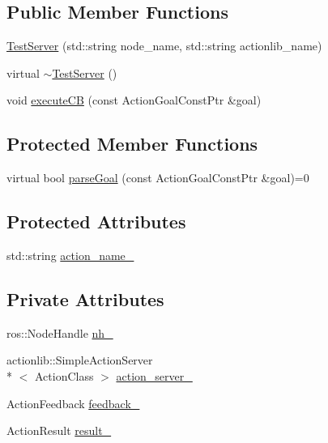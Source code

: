 \subsection*{Public Member Functions}
\begin{DoxyCompactItemize}
\item 
\hyperlink{classsarafun_1_1TestServer_a96cf3cc9457ec2c15490f2e2d216ce1f_a96cf3cc9457ec2c15490f2e2d216ce1f}{Test\-Server} (std\-::string node\-\_\-name, std\-::string actionlib\-\_\-name)
\item 
virtual \hyperlink{classsarafun_1_1TestServer_a1f29e46804b976730e607ca995684dca_a1f29e46804b976730e607ca995684dca}{$\sim$\-Test\-Server} ()
\item 
void \hyperlink{classsarafun_1_1TestServer_af09ba35e2df86537a878f7a9de8c795e_af09ba35e2df86537a878f7a9de8c795e}{execute\-C\-B} (const Action\-Goal\-Const\-Ptr \&goal)
\end{DoxyCompactItemize}
\subsection*{Protected Member Functions}
\begin{DoxyCompactItemize}
\item 
virtual bool \hyperlink{classsarafun_1_1TestServer_a85b9721105c2a4b46bae26428433513e_a85b9721105c2a4b46bae26428433513e}{parse\-Goal} (const Action\-Goal\-Const\-Ptr \&goal)=0
\end{DoxyCompactItemize}
\subsection*{Protected Attributes}
\begin{DoxyCompactItemize}
\item 
std\-::string \hyperlink{classsarafun_1_1TestServer_abe393cc25c73386e7d6783127adf98d9_abe393cc25c73386e7d6783127adf98d9}{action\-\_\-name\-\_\-}
\end{DoxyCompactItemize}
\subsection*{Private Attributes}
\begin{DoxyCompactItemize}
\item 
ros\-::\-Node\-Handle \hyperlink{classsarafun_1_1TestServer_ae6bf11c91109d481d20a450ae36cd304_ae6bf11c91109d481d20a450ae36cd304}{nh\-\_\-}
\item 
actionlib\-::\-Simple\-Action\-Server\\*
$<$ Action\-Class $>$ \hyperlink{classsarafun_1_1TestServer_aa7c467f8ff244a483678570b3c028983_aa7c467f8ff244a483678570b3c028983}{action\-\_\-server\-\_\-}
\item 
Action\-Feedback \hyperlink{classsarafun_1_1TestServer_a3a94e11b8f3df03ad0333d1630048861_a3a94e11b8f3df03ad0333d1630048861}{feedback\-\_\-}
\item 
Action\-Result \hyperlink{classsarafun_1_1TestServer_a52902161986c5800f65df63cca4ca7a9_a52902161986c5800f65df63cca4ca7a9}{result\-\_\-}
\end{DoxyCompactItemize}


